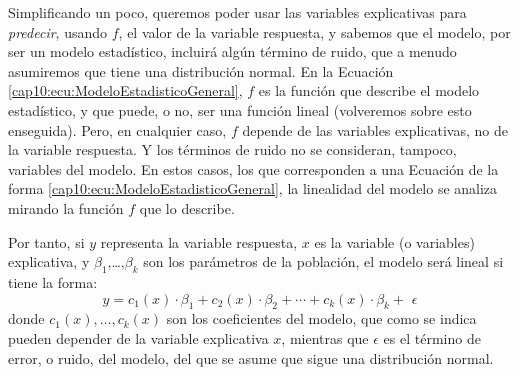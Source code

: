 Simplificando un poco, queremos poder usar las variables explicativas para {\em predecir}, usando $f$, el valor de la variable respuesta, y sabemos que el modelo, por ser un modelo estadístico, incluirá algún término de ruido, que a menudo asumiremos que tiene una distribución normal. En la Ecuación \ref{cap10:ecu:ModeloEstadisticoGeneral}, $f$ es la función que describe el modelo estadístico, y que puede, o no, ser una función lineal (volveremos sobre esto enseguida). Pero, en cualquier caso, $f$ depende de las variables explicativas, no de la variable respuesta. Y los términos de ruido no se consideran, tampoco, variables del modelo. En estos casos, los que corresponden a una Ecuación de la forma  \ref{cap10:ecu:ModeloEstadisticoGeneral}, la linealidad del modelo se analiza mirando la función $f$ que lo describe.

    \begin{center}
    \end{center}
Por tanto, si $y$ representa la variable respuesta, $x$ es la variable (o variables) explicativa, y $\beta_1$,\ldots,$\beta_k$ son los parámetros de la población, el modelo será lineal si tiene la forma:
    \begin{equation}
        \label{cap10:ecu:ModeloEstadisticoLineal}
        y=c_1(x)\cdot\beta_1+c_2(x)\cdot\beta_2+\cdots+c_k(x)\cdot\beta_k+\,\,\epsilon
    \end{equation}
donde $c_1(x),\ldots,c_k(x)$ son los coeficientes del modelo, que como se indica pueden depender de la variable explicativa $x$, mientras que $\epsilon$ es el término de error, o ruido, del modelo, del que se asume que sigue una distribución normal.




